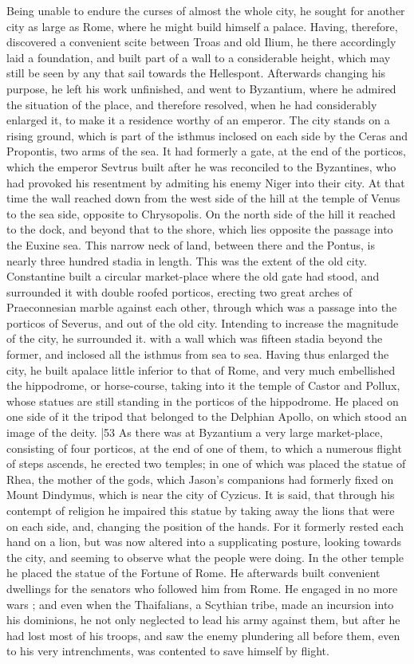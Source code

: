 Being unable to endure the curses of almost the whole city, he sought for another city as large as Rome, where he might build himself a palace. Having, therefore, discovered a convenient scite between Troas and old Ilium, he there accordingly laid a foundation, and built part of a wall to a considerable height, which may still be seen by any that sail towards the Hellespont. Afterwards changing his purpose, he left his work unfinished, and went to Byzantium, where he admired the situation of the place, and therefore resolved, when he had considerably enlarged it, to make it a residence worthy of an emperor. The city stands on a rising ground, which is part of the isthmus inclosed on each side by the Ceras and Propontis, two arms of the sea. It had formerly a gate, at the end of the porticos, which the emperor Sevtrus built after he was reconciled to the Byzantines, who had provoked his resentment by admiting his enemy Niger into their city. At that time the wall reached down from the west side of the hill at the temple of Venus to the sea side, opposite to Chrysopolis. On the north side of the hill it reached to the dock, and beyond that to the shore, which lies opposite the passage into the Euxine sea. This narrow neck of land, between there and the Pontus, is nearly three hundred stadia in length. This was the extent of the old city. Constantine built a circular market-place where the old gate had stood, and surrounded it with double roofed porticos, erecting two great arches of Praeconnesian marble against each other, through which was a passage into the porticos of Severus, and out of the old city. Intending to increase the magnitude of the city, he surrounded it. with a wall which was fifteen stadia beyond the former, and inclosed all the isthmus from sea to sea. Having thus enlarged the city, he built a\emph{}palace little inferior to that of Rome, and very much embellished the hippodrome, or horse-course, taking into it the temple of Castor and Pollux, whose statues are still standing in the porticos of the hippodrome. He placed on one side of it the tripod that belonged to the Delphian Apollo, on which stood an image of the deity.
|53 As there was at Byzantium a very large market-place, consisting of four porticos, at the end of one of them, to which a numerous flight of steps ascends, he erected two temples; in one of which was placed the statue of Rhea, the mother of the gods, which Jason's companions had formerly fixed on Mount Dindymus, which is near the city of Cyzicus. It is said, that through his contempt of religion he impaired this statue by taking away the lions that were on each side, and, changing the position of the hands. For it formerly rested each hand on a lion, but was now altered into a supplicating posture, looking towards the city, and seeming to observe what the people were doing. In the other temple he placed the statue of the Fortune of Rome. He afterwards built convenient dwellings for the senators who followed him from Rome. He engaged in no more wars ; and even when the Thaifalians, a Scythian tribe, made an incursion into his dominions, he not only neglected to lead his army against them, but after he had lost most of his troops, and saw the enemy plundering all before them, even to his very intrenchments, was contented to save himself by flight.

